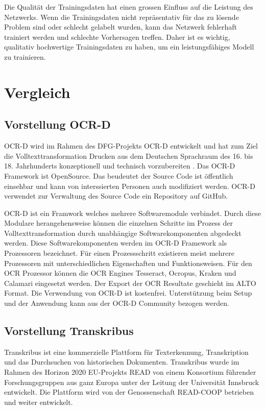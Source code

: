\documentclass[a4paper,oneside, 12pt]{report}
\begin{document}
Die Qualität der Trainingsdaten hat einen grossen Einfluss auf die Leistung des Netzwerks. Wenn die Trainingsdaten nicht repräsentativ für das zu lösende Problem sind oder schlecht gelabelt wurden, kann das Netzwerk fehlerhaft trainiert werden und schlechte Vorhersagen treffen. Daher ist es wichtig, qualitativ hochwertige Trainingsdaten zu haben, um ein leistungsfähiges Modell zu trainieren.

\chapter{Vergleich}\label{sec:vergleich}

\section{Vorstellung OCR-D}
OCR-D wird im Rahmen des DFG-Projekts OCR-D entwickelt und hat zum Ziel die Volltexttransformation Drucken aus dem Deutschen Sprachraum des 16. bis 18. Jahrhunderts konzeptionell und technisch vorzubereiten \cite{standOCR-D}. Das OCR-D Framework ist OpenSource. Das beudeutet der Source Code ist öffentlich einsehbar und kann von interssierten Personen auch modifiziert werden. OCR-D verwendet zur Verwaltung des Source Code ein Repository auf GitHub.\cite{ocrdgithub}

OCR-D ist ein Framwork welches mehrere Softwaremodule verbindet. Durch diese Modulare herangehensweise können die einzelnen Schritte im Prozess der Volltexttransformation durch unabhängige Softwarekomponenten abgedeckt werden. Diese Softwarekomponenten werden im OCR-D Framework als Prozessoren bezeichnet. Für einen Prozessschritt existieren meist mehrere Prozessoren mit unterschiedlichen Eigenschaften und Funktionsweisen. Für den \ac{OCR} Prozessor können die OCR Engines Tesseract, Ocropus, Kraken und Calamari eingesetzt werden. Der Export der OCR Resultate geschieht im ALTO Format. Die Verwendung von OCR-D ist kostenfrei. Unterstützung beim Setup und der Anwendung kann aus der OCR-D Community bezogen werden. \cite{ocrdfaq}

\section{Vorstellung Transkribus}
Transkribus ist eine kommerzielle Plattform für Texterkennung, Transkription und das Durchsuchen von historischen Dokumenten. Transkribus wurde im Rahmen des Horizon 2020 EU-Projekts READ von einem Konsortium führender Forschungsgruppen aus ganz Europa unter der Leitung der Universität Innsbruck entwickelt. Die Plattform wird von der Genossenschaft READ-COOP betrieben und weiter entwickelt. \cite{readcoopabout} 
\end{document}
